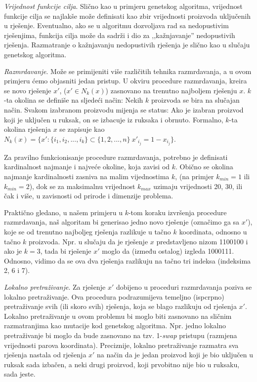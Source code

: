 \documentclass[a4paper, utf8, 11pt, colorlinks]{book}
\theoremstyle{definition}
\begin{document}
\emph{Vrijednost funkcije cilja}. Slično kao u primjeru genetskog algoritma, vrijednost funkcije cilja se najlakše može definisati kao zbir vrijednosti proizvoda uključenih u rješenje. Eventualno, ako se u algoritmu dozvoljava rad sa nedopustivim rješenjima, funkcija cilja može da sadrži i dio za ,,kažnjavanje'' nedopustivih rješenja. Razmatranje o kažnjavanju nedopustivih rješenja je slično kao u slučaju genetskog algoritma.

\emph{Razmrdavanje}. Može se primijeniti više različitih tehnika razmrdavanja, a u ovom primjeru ćemo objasniti jedan pristup. 
U okviru procedure razmrdavanja, kreira se novo rješenje $x'$, ($x' \in N_k(x)$) zasno\-vano na trenutno najboljem rješenju  $x$.
$k$-ta okolina se definiše na sljedeći način: Nekih $k$ proizvoda se bira na slučajan način. Svakom izabranom proizvodu mijenja se status: Ako je izabran proizvod koji je uključen u ruksak, on se izbacuje iz ruksaka i obrnuto. Formalno, $k$-ta okolina rješenja
$x$ se zapisuje kao  $N_k(x) = \{x':  \{i_1,i_2,...,i_k\}\subset \{1,2,...,n\}\  x'_{i_j}=1-x_{i_j}\}$.

Za pravilno funkcionisanje procedure razmrdavanja, potrebno je definisati kardinalnost najmanje i najveće okoline, koja zavisi od $k$. Obično se okolina najmanje kardinalnosti zasniva na malim vijednostima $k$, (na primjer $k_{min}=1$ ili $k_{min}=2$), dok se za maksimalnu vrijednost $k_{max}$  uzimaju vrijednosti 20, 30, ili čak i više, u zavisnosti od prirode i dimenzije problema.

Praktično gledano, u našem primjeru u $k$-tom koraku izvršenja procedure razmrdavanja, naš algoritam bi generisao jedno novo rješenje (označimo ga sa $x'$), koje se od trenutno najboljeg rješenja razlikuje u tačno $k$ koordinata, odnosno u tačno $k$ proizvoda. Npr. u slučaju da je rješenje $x$ predstavljeno nizom 1100100 i ako je $k=3$, tada bi rješenje    $x'$ moglo da  (između ostalog) izgleda
1000111. Odnosno, vidimo da se ova dva rješenja razlikuju na tačno tri indeksa (indeksima 2, 6 i 7).

\emph{Lokalno pretraživanje}. 
Za rješenje  $x'$ dobijeno u  proceduri razmrdavanja poziva se lokalno pretraživanje. Ova procedura podrazumijeva temeljno (ispcrpno) pretraživanje svih (ili skoro svih) rješenja, koja se blago razlikuju od rješenja  $x'$. Lokalno pretraživanje u ovom problemu bi moglo biti zasnovano na sličnim razmatranjima kao mutacije kod genetskog algoritma. Npr. jedno lokalno pretraživanje bi moglo da bude zasnovano na tzv. 1-\emph{swap} pristupu (razmjena vrijednosti parova koordinata). Preciznije, lokalno pretraživanje razmatra sva rješenja nastala od rješenja $x'$ na način da je jedan proizvod koji je bio uključen u ruksak sada izbačen, a neki drugi proizvod, koji prvobitno nije bio u ruksaku, sada jeste.
\end{document}
